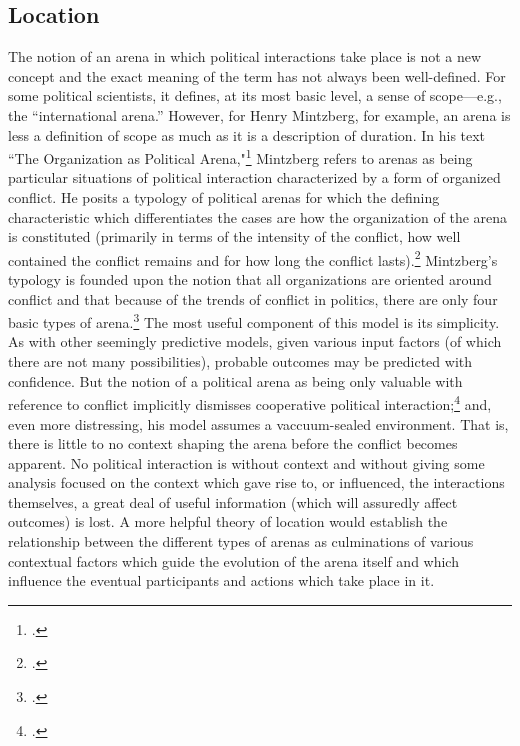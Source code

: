\documentclass{article}
\begin{document}
\subsection{Location}
The notion of an arena in which political interactions take place is not a new concept and the exact meaning of the term has not always been well-defined. 
For some political scientists, it defines, at its most basic level, a sense of scope---e.g., the ``international arena.'' 
However, for Henry Mintzberg, for example, an arena is less a definition of scope as much as it is a description of duration. 
In his text ``The Organization as Political Arena,"\footcite{mintzberg85} Mintzberg refers to arenas as being particular situations of political interaction characterized by a form of organized conflict. 
He posits a typology of political arenas for which the defining characteristic which differentiates the cases are how the organization of the arena is constituted (primarily in terms of the intensity of the conflict, how well contained the conflict remains and for how long the conflict lasts).\footcite[141]{mintzberg85} 
Mintzberg's typology is founded upon the notion that all organizations are oriented around conflict and that because of the trends of conflict in politics, there are only four basic types of arena.\footcite[These four types are ``Confrontation,'' ``Shaky alliance,'' ``Politicized organization,'' and ``Complete Political Arena.'']{mintzberg85}
The most useful component of this model is its simplicity. 
As with other seemingly predictive models, given various input factors (of which there are not many possibilities), probable outcomes may be predicted with confidence. 
But the notion of a political arena as being only valuable with reference to conflict implicitly dismisses cooperative political interaction;\footcite[152]{mintzberg85} and, even more distressing, his model assumes a vaccuum-sealed environment. 
That is, there is little to no context shaping the arena before the conflict becomes apparent. 
No political interaction is without context and without giving some analysis focused on the context which gave rise to, or influenced, the interactions themselves, a great deal of useful information (which will assuredly affect outcomes) is lost.
A more helpful theory of location would establish the relationship between the different types of arenas as culminations of various contextual factors which guide the evolution of the arena itself and which influence the eventual participants and actions which take place in it.
\end{document}
